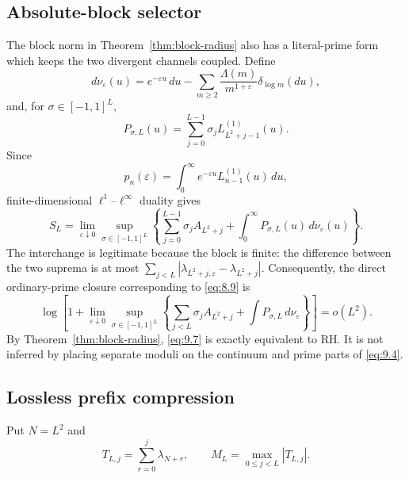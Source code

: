 \documentclass[11pt]{amsart}
\numberwithin{equation}{section}
\theoremstyle{definition}
\theoremstyle{remark}
\newcommand{\eps}{\varepsilon}
\begin{document}
\subsection{Absolute-block selector}

The block norm in Theorem~\ref{thm:block-radius} also has a literal-prime
form which keeps the two divergent channels coupled. Define
\begin{equation}
 d\nu_\eps(u)
 =e^{-\eps u}\,du
 -\sum_{m\ge2}\frac{\Lambda(m)}{m^{1+\eps}}
       \delta_{\log m}(du),                              \label{eq:9.4}
\end{equation}
and, for \(\sigma\in[-1,1]^L\),
\begin{equation}
 P_{\sigma,L}(u)
 =\sum_{j=0}^{L-1}\sigma_jL_{L^2+j-1}^{(1)}(u).         \label{eq:9.5}
\end{equation}
Since
\[
 p_n(\eps)=\int_0^\infty e^{-\eps u}L_{n-1}^{(1)}(u)\,du,
\]
finite-dimensional \(\ell^1\)--\(\ell^\infty\) duality gives
\begin{equation}
\boxed{
 S_L=\lim_{\eps\downarrow0}\sup_{\sigma\in[-1,1]^L}
 \left\{
 \sum_{j=0}^{L-1}\sigma_jA_{L^2+j}
 +\int_0^\infty P_{\sigma,L}(u)\,d\nu_\eps(u)
 \right\}.}                                             \label{eq:9.6}
\end{equation}
The interchange is legitimate because the block is finite: the difference
between the two suprema is at most
\(\sum_{j<L}|\lambda_{L^2+j,\eps}-\lambda_{L^2+j}|\).
Consequently, the direct ordinary-prime closure corresponding to \eqref{eq:8.9} is
\begin{equation}
 \log\!\left[1+\lim_{\eps\downarrow0}
 \sup_{\sigma\in[-1,1]^L}
 \left\{
 \sum_{j<L}\sigma_jA_{L^2+j}
 +\int P_{\sigma,L}\,d\nu_\eps
 \right\}\right]=o(L^2).                               \label{eq:9.7}
\end{equation}
By Theorem~\ref{thm:block-radius}, \eqref{eq:9.7} is exactly equivalent to RH.
It is not inferred by placing separate moduli on the continuum and prime
parts of \eqref{eq:9.4}.

\subsection{Lossless prefix compression}

Put \(N=L^2\) and
\begin{equation}
 T_{L,j}=\sum_{r=0}^{j}\lambda_{N+r},\qquad
 M_L=\max_{0\le j<L}|T_{L,j}|.                          \label{eq:9.8}
\end{equation}
\end{document}
